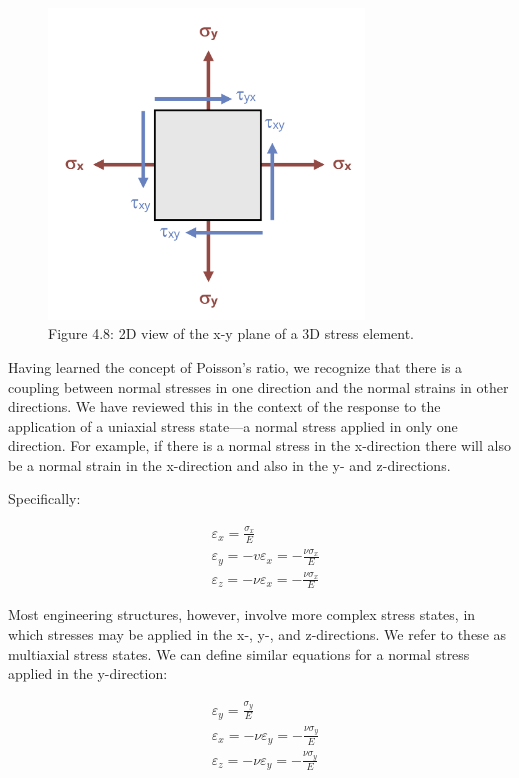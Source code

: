 \documentclass[
  letterpaper,
  DIV=11,
  numbers=noendperiod]{scrreprt}
\begin{document}
\begin{figure}[H]

{\centering \includegraphics[width=3.30208in,height=\textheight]{images/CH4 PNGs/4.8.png}

}

\caption{Figure 4.8: 2D view of the x-y plane of a 3D stress element.}

\end{figure}%

Having learned the concept of Poisson's ratio, we recognize that there
is a coupling between normal stresses in one direction and the normal
strains in other directions. We have reviewed this in the context of the
response to the application of a uniaxial stress state---a normal stress
applied in only one direction. For example, if there is a normal stress
in the x-direction there will also be a normal strain in the x-direction
and also in the y- and z-directions.

Specifically:

\[
\begin{aligned}
& \varepsilon_x=\frac{\sigma_x}{E} \\
& \varepsilon_y=-v \varepsilon_x=-\frac{\nu \sigma_x}{E} \\
& \varepsilon_z=-\nu \varepsilon_x=-\frac{\nu \sigma_x}{E}
\end{aligned}
\]

Most engineering structures, however, involve more complex stress
states, in which stresses may be applied in the x-, y-, and
z-directions. We refer to these as multiaxial stress states. We can
define similar equations for a normal stress applied in the y-direction:

\[
\begin{aligned}
& \varepsilon_y=\frac{\sigma_y}{E} \\
& \varepsilon_x=-\nu \varepsilon_y=-\frac{\nu \sigma_y}{E} \\
& \varepsilon_z=-\nu \varepsilon_y=-\frac{\nu \sigma_y}{E}
\end{aligned}
\]
\end{document}

